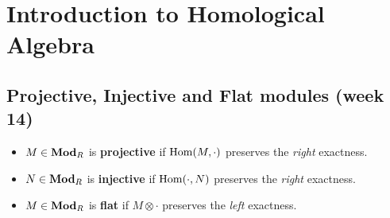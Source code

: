 \section{Introduction to Homological Algebra}

\subsection{Projective, Injective and Flat modules (week 14)}

\begin{definition} \mbox{}
  \begin{itemize}
    \item $M \in \mathbf{Mod}_R$ is {\bf projective} if $\operatorname{Hom}(M, \cdot)$ preserves the
      {\it right} exactness.
    \item $N \in \mathbf{Mod}_R$ is {\bf injective} if $\operatorname{Hom}(\cdot, N)$ preserves the
      {\it right} exactness.
    \item $M \in \mathbf{Mod}_R$ is {\bf flat} if $M\otimes \cdot$ preserves the
      {\it left} exactness.
  \end{itemize}
\end{definition}

